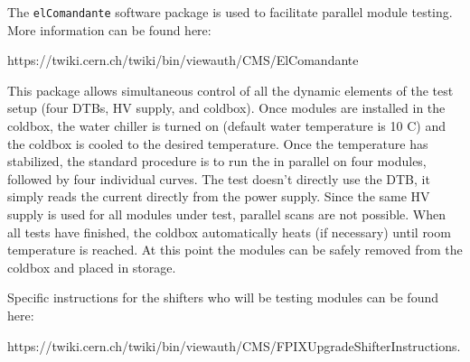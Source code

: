 The {\tt elComandante} software package is used to facilitate parallel module testing.
More information can be found here: 
\begin{center}
https://twiki.cern.ch/twiki/bin/viewauth/CMS/ElComandante
\end{center}
This package allows simultaneous control of all the dynamic elements of the test setup (four DTBs, HV supply, and coldbox).
Once modules are installed in the coldbox, 
the water chiller is turned on (default water temperature is 10 C) and the coldbox is cooled to the desired temperature.
Once the temperature has stabilized, 
the standard procedure is to run the \fulltest in parallel on four modules, followed by four individual \iv curves.
The \iv test doesn't directly use the DTB, it simply reads the current directly from the power supply.
Since the same HV supply is used for all modules under test, parallel \iv scans are not possible.
When all tests have finished, the coldbox automatically heats (if necessary) until room temperature is reached.
At this point the modules can be safely removed from the coldbox and placed in storage.

Specific instructions for the shifters who will be testing modules can be found here:
\begin{center}
https://twiki.cern.ch/twiki/bin/viewauth/CMS/FPIXUpgradeShifterInstructions.
\end{center}
